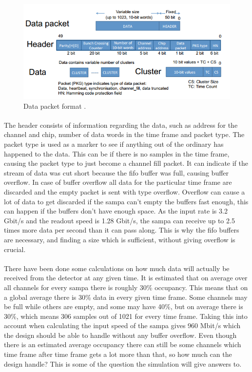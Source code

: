 \documentclass[a4paper, 12pt, openright, twoside]{report}
\begin{document}
\begin{figure}[h!]
	\centering
		\includegraphics[width=1.0\textwidth]{images/packet.png}
		\caption[Data packet format]{Data packet format \cite{tdr-015}.}
		\label{fig:packet}
\end{figure}

\paragraph{}
The header consists of information regarding the data, such as address for the channel and chip, number of data words in the time frame and packet type.
The packet type is used as a marker to see if anything out of the ordinary has happened to the data.
This can be if there is no samples in the time frame, causing the packet type to just become a channel fill packet.
It can indicate if the stream of data was cut short because the \gls{fifo} buffer was full, causing buffer overflow.
In case of buffer overflow all data for the particular time frame are discarded and the empty packet is sent with type overflow.
Overflow can cause a lot of data to get discarded if the \gls{sampa} can't empty the buffers fast enough, this can happen if the buffers don't have enough space.
As the input rate is 3.2 Gbit/s and the readout speed is 1.28 Gbit/s, the \gls{sampa} can receive up to 2.5 times more data per second than it can pass along.
This is why the \gls{fifo} buffers are necessary, and finding a size which is sufficient, without giving overflow is crucial.

\paragraph{}
There have been done some calculations on how much data will actually be received from the detector at any given time.
It is estimated that on average over all channels for every \gls{sampa} there is roughly 30\% occupancy.
This means that on a global average there is 30\% data in every given time frame.
Some channels may be full while others are empty, and some may have 40\%, but on average there is 30\%, which means 306 samples out of 1021 for every time frame.
Taking this into account when calculating the input speed of the \gls{sampa} gives 960 Mbit/s which the design should be able to handle without any buffer overflow.
Even though there is an estimated average occupancy there can still be some channels which time frame after time frame gets a lot more than that, so how much can the design handle?
This is some of the question the simulation will give answers to.
\end{document}
